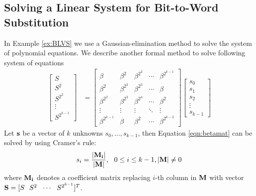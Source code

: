 \subsection{Solving a Linear System for Bit-to-Word Substitution}
In Example \ref{ex:BLVS} we use a Gaussian-elimination method to solve the system of polynomial
equations. We describe another formal method to solve following system of equations
\begin{align}
\label{eqn:betamat}
\begin{bmatrix}
S \\
S^2 \\
S^{2^2} \\
\vdots \\
S^{2^{k-1}}
\end{bmatrix}
&=
\begin{bmatrix}
\beta & \beta^{2} & \beta^{2^2} & \cdots & \beta^{2^{k-1}}\\
\beta^{2} & \beta^{2^2} & \beta^{2^3} & \cdots & \beta \\
\beta^{2^2} & \beta^{2^3} & \beta^{2^4} & \cdots & \beta^2\\
\vdots & \vdots & \vdots & \ddots & \vdots \\
\beta^{2^{k-1}} & \beta & \beta^2 & \cdots & \beta^{2^{k-2}}
\end{bmatrix}
\begin{bmatrix}
s_0\\
s_1\\
s_2\\
\vdots\\
s_{k-1}
\end{bmatrix}
\end{align}
Let ${\bf s}$ be a vector of $k$ unknowns $s_0,\dots,s_{k-1}$,
then Equation \ref{eqn:betamat} can be solved by using Cramer's rule:
\begin{equation}
\label{eqn:Cramer}
s_i = \frac{{|\bf M_i|}}{{|\bf M}|}, \ \ 0\leq i\leq k-1, {|\bf M}| \neq 0
\end{equation}
where ${\bf M_i}$ denotes a coefficient matrix replacing $i$-th column in ${\bf M}$ with
vector ${\bf S} = [S~~S^2~~\cdots~~S^{2^{k-1}}]^T$.

